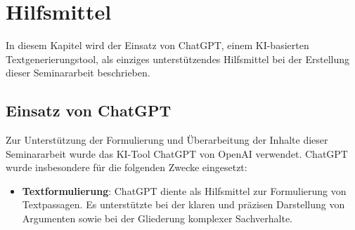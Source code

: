 \chapter{Hilfsmittel}

In diesem Kapitel wird der Einsatz von ChatGPT, einem KI-basierten Textgenerierungstool, als einziges unterstützendes Hilfsmittel bei der Erstellung dieser Seminararbeit beschrieben.

\section{Einsatz von ChatGPT}

Zur Unterstützung der Formulierung und Überarbeitung der Inhalte dieser Seminararbeit wurde das KI-Tool ChatGPT von OpenAI verwendet. ChatGPT wurde insbesondere für die folgenden Zwecke eingesetzt:

\begin{itemize}
	\item \textbf{Textformulierung}: ChatGPT diente als Hilfsmittel zur Formulierung von Textpassagen. Es unterstützte bei der klaren und präzisen Darstellung von Argumenten sowie bei der Gliederung komplexer Sachverhalte.

\end{itemize}